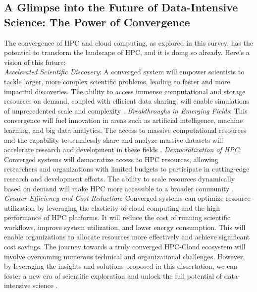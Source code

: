 \subsection{A Glimpse into the Future of Data-Intensive Science: The Power of Convergence}
\label{subsec:future}

    The convergence of HPC and cloud computing, as explored in this survey, has the potential to transform the landscape of HPC, and it is doing so already. Here’s a vision of this future:\\
    \newline
    \newline
    \noindent
    \textit{Accelerated Scientific Discovery}: A converged system will empower scientists to tackle larger, more complex scientific problems, leading to faster and more impactful discoveries. The ability to access immense computational and storage resources on demand, coupled with efficient data sharing, will enable simulations of unprecedented scale and complexity \cite{gadban_analyzing_2022, netto_hpc_2019}.
    \newline
    \newline
    \noindent
    \textit{Breakthroughs in Emerging Fields}: This convergence will fuel innovation in areas such as artificial intelligence, machine learning, and big data analytics. The access to massive computational resources and the capability to seamlessly share and analyze massive datasets will accelerate research and development in these fields \cite{silva_review_2024, liang_scalable_2022}.
    \newline
    \newline
    \noindent
    \textit{Democratization of HPC}: Converged systems will democratize access to HPC resources, allowing researchers and organizations with limited budgets to participate in cutting-edge research and development efforts. The ability to scale resources dynamically based on demand will make HPC more accessible to a broader community \cite{reed_hpc_2023}.
    \newline
    \newline
    \noindent
    \textit{Greater Efficiency and Cost Reduction}: Converged systems can optimize resource utilization by leveraging the elasticity of cloud computing and the high performance of HPC platforms. It will reduce the cost of running scientific workflows, improve system utilization, and lower energy consumption. This will enable organizations to allocate resources more effectively and achieve significant cost savings. The journey towards a truly converged HPC-Cloud ecosystem will involve overcoming numerous technical and organizational challenges. However, by leveraging the insights and solutions proposed in this dissertation, we can foster a new era of scientific exploration and unlock the full potential of data-intensive science \cite{noauthor_hpccloud_nodate, alam_versatile_2023, gadban_analyzing_2022, liang_scalable_2022, netto_deciding_2015}. \\

